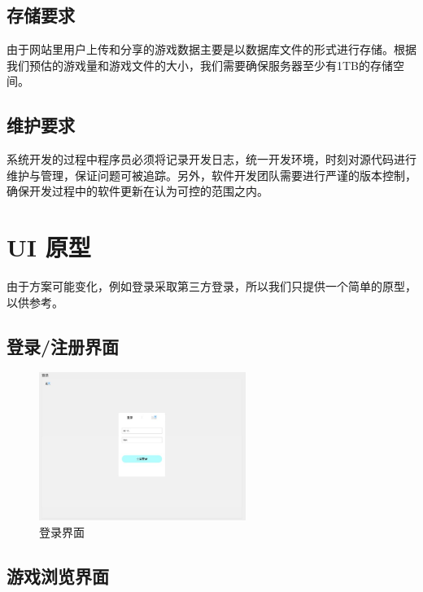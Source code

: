 \documentclass[12pt]{ctexart} %
\begin{document}
\subsection{存储要求}
由于网站里用户上传和分享的游戏数据主要是以数据库文件的形式进行存储。根据我们预估的游戏量和游戏文件的大小，我们需要确保服务器至少有1TB的存储空间。
\subsection{维护要求}
系统开发的过程中程序员必须将记录开发日志，统一开发环境，时刻对源代码进行维护与管理，保证问题可被追踪。另外，软件开发团队需要进行严谨的版本控制，确保开发过程中的软件更新在认为可控的范围之内。
\section{UI 原型}

由于方案可能变化，例如登录采取第三方登录，所以我们只提供一个简单的原型，以供参考。

\subsection{登录/注册界面}

\begin{figure}[htbp]
  \centering
  \includegraphics[width=0.6\textwidth]{login.jpg}
  \caption{登录界面}
\end{figure}

\subsection{游戏浏览界面}
\end{document}
